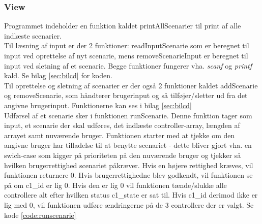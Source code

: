 \subsubsection*{View}
Programmet indeholder en funktion kaldet printAllScenarier til print af alle indlæste scenarier.\\

Til læsning af input er der 2 funktioner: readInputScenarie som er beregnet til input ved oprettelse af nyt scenarie, mens removeScenarieInput er beregnet til input ved sletning af et scenarie. Begge funktioner fungerer vha. \textit{scanf} og \textit{printf} kald. Se bilag \ref{sec:bilcd} for koden.\\

Til oprettelse og sletning af scenarier er der også 2 funktioner kaldet addScenarie og removeScenarie, som håndterer brugerinput og så tilføjer/sletter ud fra det angivne brugerinput. Funktionerne kan ses i bilag \ref{sec:bilcd}\\

Udførsel af et scenarie sker i funktionen runScenarie. Denne funktion tager som input, et scenarie der skal udføres, det indlæste controller-array, længden af arrayet samt nuværende bruger. Funktionen starter med at tjekke om den angivne bruger har tilladelse til at benytte scenariet - dette bliver gjort vha. en swich-case som kigger på prioriteten på den nuværende bruger og tjekker så hvilken brugerrettighed scenariet påkræver. Hvis en højere rettighed kræves, vil funktionen returnere 0. Hvis brugerrettighedne blev godkendt, vil funktionen se på om c1\_id er lig 0. Hvis den er lig 0 vil funktionen tænde/slukke alle controllere alt efter hvilken status c1\_state er sat til. Hvis c1\_id derimod ikke er lig med 0, vil funktionen udføre ændringerne på de 3 controllere der er valgt. Se kode \ref{code:runscenarie}



